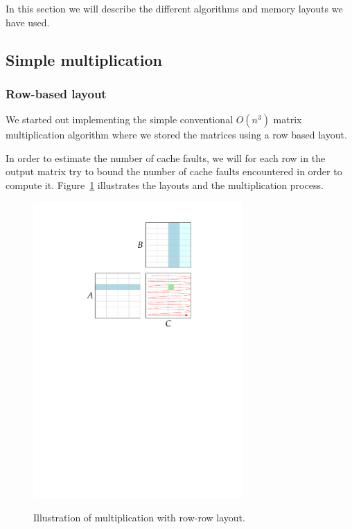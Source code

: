 In this section we will describe the different algorithms and memory
layouts we have used.

\subsection{Simple multiplication}

\subsubsection{Row-based layout}
We started out implementing the simple conventional $O(n^3)$ matrix
multiplication algorithm where we stored the matrices using a row
based layout.

In order to estimate the number of cache faults, we will for each row
in the output matrix try to bound the number of cache faults
encountered in order to compute it. Figure~\ref{fig:rowrowmul}
illustrates the layouts and the multiplication process.
\begin{figure}[h!]
  \centering
  \includegraphics[width=8cm]{images/rowrowmul}
  \label{fig:rowrowmul}
  \caption{Illustration of multiplication with row-row layout.}
\end{figure}

